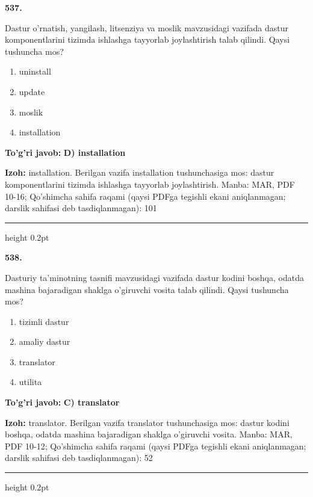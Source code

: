 \documentclass[10pt,a4paper]{article}
\begin{document}
{\bfseries\sffamily\color{ink} 537.}
\par
Dastur o'rnatish, yangilash, litsenziya va moslik mavzusidagi vazifada dastur komponentlarini tizimda ishlashga tayyorlab joylashtirish talab qilindi. Qaysi tushuncha mos?
\begin{enumerate}[label=\Alph*),leftmargin=9mm]
\item uninstall
\item update
\item moslik
\item installation
\end{enumerate}
\begin{tcolorbox}[enhanced,breakable,colback=teal!4,colframe=teal!60!black,boxrule=0.45pt,arc=1.2mm,left=2.7mm,right=2.7mm,top=1.8mm,bottom=1.8mm,before skip=2mm,after skip=2mm]
{\bfseries\sffamily\color{teal}To'g'ri javob:} \textbf{D) installation}
\par\smallskip
{\bfseries Izoh:} installation. Berilgan vazifa installation tushunchasiga mos: dastur komponentlarini tizimda ishlashga tayyorlab joylashtirish. Manba: MAR, PDF 10-16; Qo'shimcha sahifa raqami (qaysi PDFga tegishli ekani aniqlanmagan; darslik sahifasi deb tasdiqlanmagan): 101
\end{tcolorbox}
\vspace{2mm}\hrule height 0.2pt\vspace{3mm}

{\bfseries\sffamily\color{ink} 538.}
\par
Dasturiy ta'minotning tasnifi mavzusidagi vazifada dastur kodini boshqa, odatda mashina bajaradigan shaklga o'giruvchi vosita talab qilindi. Qaysi tushuncha mos?
\begin{enumerate}[label=\Alph*),leftmargin=9mm]
\item tizimli dastur
\item amaliy dastur
\item translator
\item utilita
\end{enumerate}
\begin{tcolorbox}[enhanced,breakable,colback=teal!4,colframe=teal!60!black,boxrule=0.45pt,arc=1.2mm,left=2.7mm,right=2.7mm,top=1.8mm,bottom=1.8mm,before skip=2mm,after skip=2mm]
{\bfseries\sffamily\color{teal}To'g'ri javob:} \textbf{C) translator}
\par\smallskip
{\bfseries Izoh:} translator. Berilgan vazifa translator tushunchasiga mos: dastur kodini boshqa, odatda mashina bajaradigan shaklga o'giruvchi vosita. Manba: MAR, PDF 10-12; Qo'shimcha sahifa raqami (qaysi PDFga tegishli ekani aniqlanmagan; darslik sahifasi deb tasdiqlanmagan): 52
\end{tcolorbox}
\vspace{2mm}\hrule height 0.2pt\vspace{3mm}
\end{document}
